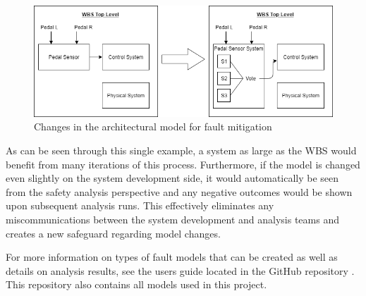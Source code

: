 \begin{figure}[h!]
	\begin{center}
		\includegraphics[width=\textwidth]{images/sensorsystem.png}
	\end{center}
	\vspace{-0.3in}
	\caption{Changes in the architectural model for fault mitigation}
	\label{fig:sensorsystem}
\end{figure}

As can be seen through this single example, a system as large as the WBS would benefit from many iterations of this process. Furthermore, if the model is changed even slightly on the system development side, it would automatically be seen from the safety analysis perspective and any negative outcomes would be shown upon subsequent analysis runs. This effectively eliminates any miscommunications between the system development and analysis teams and creates a new safeguard regarding model changes. 

For more information on types of fault models that can be created as well as details on analysis results, see the users guide located in the GitHub repository \cite{SAGithub}. This repository also contains all models used in this project. 


